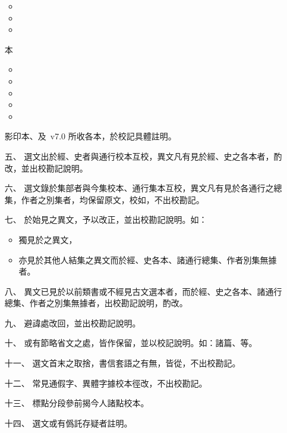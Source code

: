 \begin{enumerate}
\begin{itemize}
        \item {}
        \item {}
        \item {}
    \end{itemize}
    本
    \begin{itemize}
        \item {}
        \item {}
        \item {}
        \item {}
        \item {}
    \end{itemize}
    影印本、及\ v7.0 所收各本，於校記具體註明。
    \item[五、] 選文出於經、史者與通行校本互校，異文凡有見於經、史之各本者，酌改，並出校勘記說明。
    \item[六、] 選文錄於集部者與今集校本、通行集本互校，異文凡有見於各通行之總集，作者之別集者，均保留原文，校如，不出校勘記。
    \item[七、] 於始見之異文，予以改正，並出校勘記說明。如：\begin{itemize}
        \item 獨見於之異文，
        \item 亦見於其他人結集之異文而於經、史各本、諸通行總集、作者別集無據者。
    \end{itemize}
    \item[八、] 異文已見於以前類書或不經見古文選本者，而於經、史之各本、諸通行總集、作者之別集無據者，出校勘記說明，酌改。
    \item[九、] 避諱處改回，並出校勘記說明。
    \item[十、] 或有節略省文之處，皆作保留，並以校記說明。如：諸篇、等。
    \item[十一、] 選文首末之取捨，書信套語之有無，皆從，不出校勘記。
    \item[十二、] 常見通假字、異體字據校本徑改，不出校勘記。
    \item[十三、] 標點分段參前揭今人諸點校本。
    \item[十四、] 選文或有僞託存疑者註明。 
\end{enumerate}
  